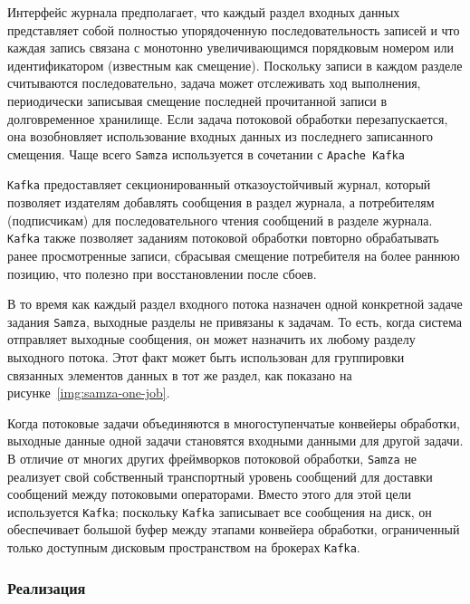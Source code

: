 Интерфейс журнала предполагает, что каждый раздел входных данных представляет собой полностью упорядоченную последовательность записей и что каждая запись связана с монотонно увеличивающимся порядковым номером или идентификатором (известным как смещение). 
Поскольку записи в каждом разделе считываются последовательно, задача может отслеживать ход выполнения, периодически записывая смещение последней прочитанной записи в долговременное хранилище. 
Если задача потоковой обработки перезапускается, она возобновляет использование входных данных из последнего записанного смещения. 
Чаще всего \texttt{Samza} используется в сочетании с \texttt{Apache Kafka}

\texttt{Kafka} предоставляет секционированный отказоустойчивый журнал, который позволяет издателям добавлять сообщения в раздел журнала, а потребителям (подписчикам) для последовательного чтения сообщений в разделе журнала.
\texttt{Kafka} также позволяет заданиям потоковой обработки повторно обрабатывать ранее просмотренные записи, сбрасывая смещение потребителя на более раннюю позицию, что полезно при восстановлении после сбоев.

В то время как каждый раздел входного потока назначен одной конкретной задаче задания \texttt{Samza}, выходные разделы не привязаны к задачам. 
То есть, когда система отправляет выходные сообщения, он может назначить их любому разделу выходного потока. 
Этот факт может быть использован для группировки связанных элементов данных в тот же раздел, как показано на рисунке~\ref{img:samza-one-job}.


Когда потоковые задачи объединяются в многоступенчатые конвейеры обработки, выходные данные одной задачи становятся входными данными для другой задачи. 
В отличие от многих других фреймворков потоковой обработки, \texttt{Samza} не реализует свой собственный транспортный уровень сообщений для доставки сообщений между потоковыми операторами. 
Вместо этого для этой цели используется \texttt{Kafka}; поскольку \texttt{Kafka} записывает все сообщения на диск, он обеспечивает большой буфер между этапами конвейера обработки, ограниченный только доступным дисковым пространством на брокерах \texttt{Kafka}.

\subsubsection{Реализация}

